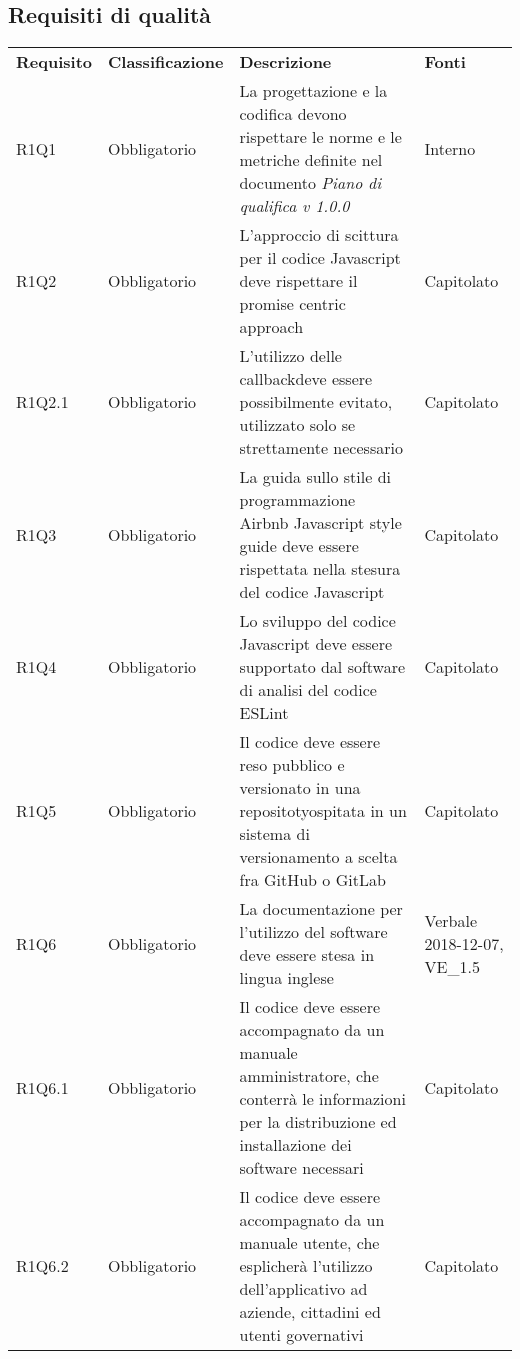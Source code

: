\subsection{Requisiti di qualità}
\begin{center}
	
	\begin{longtable}{ >{\centering}p{} >{\centering}p{}
			>{\raggedright}p{} >{\centering}p{}}
		
		\rowcolorhead 
		\textbf{\color{white}Requisito} 
		& \textbf{\color{white}Classificazione} 
		& \centering\textbf{\color{white}Descrizione}
		& \textbf{\color{white}Fonti} 
		\tabularnewline 	
		
		R1Q1	&	Obbligatorio	&	La progettazione e la codifica devono rispettare le norme e le metriche definite nel documento \textit{Piano di qualifica v 1.0.0}	&	Interno	\tabularnewline
		R1Q2	&	Obbligatorio	&	L’approccio di scittura per il codice Javascript deve rispettare il promise centric approach	&	Capitolato	\tabularnewline
		R1Q2.1	&	Obbligatorio	&	L'utilizzo delle callback\glosp deve essere possibilmente evitato, utilizzato solo se strettamente necessario	&	Capitolato	\tabularnewline
		R1Q3	&	Obbligatorio	&	La guida sullo stile di programmazione Airbnb Javascript style guide deve essere rispettata nella stesura del codice Javascript 	&	Capitolato	\tabularnewline
		R1Q4	&	Obbligatorio	&	Lo sviluppo del codice Javascript deve essere supportato dal software di analisi del codice ESLint\glo	&	Capitolato	\tabularnewline
		R1Q5	&	Obbligatorio	&	Il codice deve essere reso pubblico e versionato in una repositoty\glosp ospitata in un sistema di versionamento a scelta fra GitHub o GitLab	&	Capitolato	\tabularnewline
		R1Q6	&	Obbligatorio	&	La documentazione per l'utilizzo del software deve essere stesa in lingua inglese	&	Verbale 2018-12-07, VE\_1.5	\tabularnewline
		R1Q6.1	&	Obbligatorio	&	Il codice deve essere accompagnato da un manuale amministratore, che conterrà le informazioni per la distribuzione ed installazione dei software necessari	&	Capitolato	\tabularnewline
		R1Q6.2	&	Obbligatorio	&	Il codice deve essere accompagnato da un manuale utente, che esplicherà l'utilizzo dell'applicativo ad aziende, cittadini ed utenti governativi	&	Capitolato	\tabularnewline
	
	
		
	\end{longtable}
\end{center}

